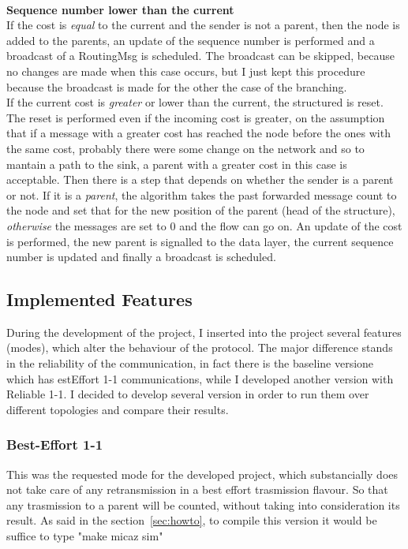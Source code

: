 \documentclass{article}
\begin{document}
\\\textbf{Sequence number lower than the current}
\\If the cost is \emph{equal} to the current and the sender is not a parent, then the node is added to the parents, an update of the sequence number is performed and a broadcast of a RoutingMsg is scheduled. The broadcast can be skipped, because no changes are made when this case occurs, but I just kept this procedure because the broadcast is made for the other the case of the branching.
\\If the current cost is \emph{greater} or lower than the current, the structured is reset. The reset is performed even if the incoming cost is greater, on the assumption that if a message with a greater cost has reached the node before the ones with the same cost, probably there were some change on the network and so to mantain a path to the sink, a parent with a greater cost in this case is acceptable. Then there is a step that depends on whether the sender is a parent or not. If it is a \emph{parent}, the algorithm takes the past forwarded message count to the node and set that for the new position of the parent (head of the structure), \emph{otherwise} the messages are set to 0 and the flow can go on. An update of the cost is performed, the new parent is signalled to the data layer, the current sequence number is updated and finally a broadcast is scheduled.
\clearpage
	\subsection{Implemented Features}
	
During the development of the project, I inserted into the project several features (modes), which alter the behaviour of the protocol. The major difference stands in the reliability of the communication, in fact there is the baseline versione which has estEffort 1-1 communications, while I developed another version with Reliable 1-1. I decided to develop several version in order to run them over different topologies and compare their results.

		\subsubsection{Best-Effort 1-1}
	
This was the requested mode for the developed project, which substancially does not take care of any retransmission in a best effort trasmission flavour. So that any trasmission to a parent will be counted, without taking into consideration its result. As said in the section~\ref{sec:howto}, to compile this version it would be suffice to type "make micaz sim"
\end{document}
